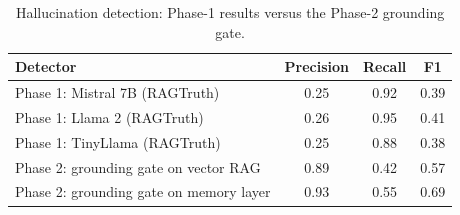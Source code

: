 \begin{table}[htbp]\centering\small
\begin{tabular}{lccc}\hline
\textbf{Detector} & \textbf{Precision} & \textbf{Recall} & \textbf{F1}\\\hline
Phase 1: Mistral 7B (RAGTruth) & 0.25 & 0.92 & 0.39\\
Phase 1: Llama 2 (RAGTruth) & 0.26 & 0.95 & 0.41\\
Phase 1: TinyLlama (RAGTruth) & 0.25 & 0.88 & 0.38\\\hline
Phase 2: grounding gate on vector RAG & 0.89 & 0.42 & 0.57\\
Phase 2: grounding gate on memory layer & 0.93 & 0.55 & 0.69\\
\hline\end{tabular}
\caption{Hallucination detection: Phase-1 results versus the Phase-2 grounding gate.}\label{tab:halluc}\end{table}
